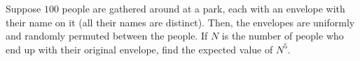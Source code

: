 Suppose $100$ people are gathered around at a park, each with an envelope with their name on it (all their names are distinct). Then, the envelopes are uniformly and randomly permuted between the people. If $N$ is the number of people who end up with their original envelope, find the expected value of $N^{5}$.